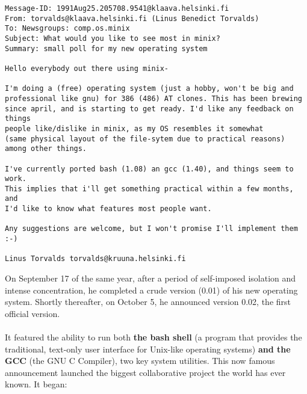 \documentclass[11pt]{article}
\begin{document}
\begin{verbatim}
Message-ID: 1991Aug25.205708.9541@klaava.helsinki.fi 
From: torvalds@klaava.helsinki.fi (Linus Benedict Torvalds) 
To: Newsgroups: comp.os.minix 
Subject: What would you like to see most in minix? 
Summary: small poll for my new operating system

Hello everybody out there using minix-

I'm doing a (free) operating system (just a hobby, won't be big and
professional like gnu) for 386 (486) AT clones. This has been brewing 
since april, and is starting to get ready. I'd like any feedback on things 
people like/dislike in minix, as my OS resembles it somewhat
(same physical layout of the file-sytem due to practical reasons)
among other things.

I've currently ported bash (1.08) an gcc (1.40), and things seem to work. 
This implies that i'll get something practical within a few months, and 
I'd like to know what features most people want.

Any suggestions are welcome, but I won't promise I'll implement them :-)

Linus Torvalds torvalds@kruuna.helsinki.fi
\end{verbatim}
On September 17 of the same year, after a period of self-imposed isolation and intense concentration, he completed a crude version (0.01) of his new operating system. Shortly thereafter, on October 5, he announced version 0.02, the first official version.\\
\\
It featured the ability to run both \textbf{the bash shell} (a program that provides the traditional, text-only user interface for Unix-like operating systems) \textbf{and the GCC} (the GNU C Compiler), two key system utilities. This now famous announcement launched the biggest collaborative project the world has ever known. It began:
\end{document}
